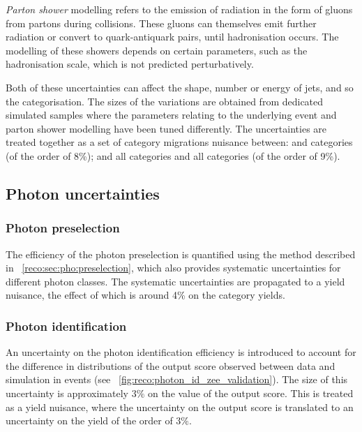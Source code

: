 \emph{Parton shower} modelling refers to the emission of \QCD radiation in the form of gluons from partons during \pp collisions. These gluons can themselves emit further \QCD radiation or convert to quark-antiquark pairs, until hadronisation occurs. The modelling of these showers depends on certain parameters, such as the hadronisation scale, which is not predicted perturbatively. 

Both of these uncertainties can affect the shape, number or energy of jets, and so the \VBF categorisation. The sizes of the variations are obtained from dedicated simulated samples where the parameters relating to the underlying event and parton shower modelling have been tuned differently. The uncertainties are treated together as a set of category migrations nuisance between:  and  categories (of the order of 8\%); and all \VBFTag categories and all \Untagged categories (of the order of 9\%).
\fi
\subsection{Photon uncertainties}

\subsubsection{Photon preselection}
The efficiency of the photon preselection is quantified using the \TagAndProbe method described in \Sec~\ref{reco:sec:pho:preselection}, which also provides systematic uncertainties for different photon classes. The systematic uncertainties are propagated to a yield nuisance, the effect of which is around 4\% on the category yields.

\subsubsection{Photon identification}
An uncertainty on the photon identification efficiency is introduced to account for the difference in distributions of the \PhoIdBdt output score observed between data and simulation in \Zee events (see \Fig~\ref{fig:reco:photon_id_zee_validation}). The size of this uncertainty is approximately $3\%$ on the value of the output score. This is treated as a yield nuisance, where the uncertainty on the output score is translated to an uncertainty on the yield of the order of $3\%$. 


